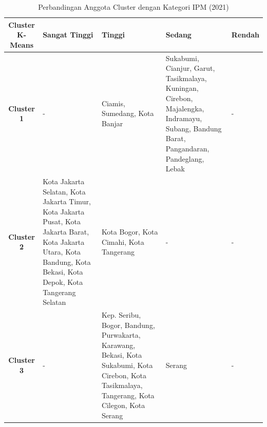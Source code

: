 \begin{table}[H]
\centering
\caption{Perbandingan Anggota Cluster dengan Kategori IPM (2021)} \label{tab:ipm_cross_2021}
\begin{tabular}{|c|p{2cm}|p{2cm}|p{2cm}|p{2cm}|}
\hline
\textbf{Cluster K-Means} & \textbf{Sangat Tinggi} & \textbf{Tinggi} & \textbf{Sedang} & \textbf{Rendah} \\ \hline
\textbf{Cluster 1} & - & Ciamis, Sumedang, Kota Banjar & Sukabumi, Cianjur, Garut, Tasikmalaya, Kuningan, Cirebon, Majalengka, Indramayu, Subang, Bandung Barat, Pangandaran, Pandeglang, Lebak & - \\ \hline
\textbf{Cluster 2} & Kota Jakarta Selatan, Kota Jakarta Timur, Kota Jakarta Pusat, Kota Jakarta Barat, Kota Jakarta Utara, Kota Bandung, Kota Bekasi, Kota Depok, Kota Tangerang Selatan & Kota Bogor, Kota Cimahi, Kota Tangerang & - & - \\ \hline
\textbf{Cluster 3} & - & Kep. Seribu, Bogor, Bandung, Purwakarta, Karawang, Bekasi, Kota Sukabumi, Kota Cirebon, Kota Tasikmalaya, Tangerang, Kota Cilegon, Kota Serang & Serang & - \\ \hline
\end{tabular}
\end{table}